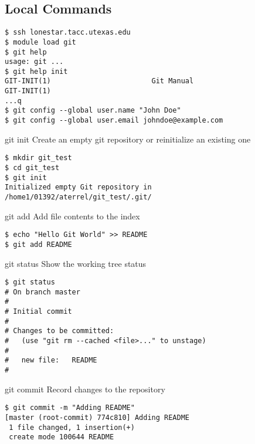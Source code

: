 \subsection{Local Commands}
\begin{frame}[fragile]
\begin{verbatim}
$ ssh lonestar.tacc.utexas.edu
$ module load git
$ git help
usage: git ...
$ git help init
GIT-INIT(1)                        Git Manual                       GIT-INIT(1)
...q
$ git config --global user.name "John Doe"
$ git config --global user.email johndoe@example.com
\end{verbatim}
\end{frame}
\begin{frame}[fragile]
\begin{block}{git init}
Create an empty git repository or reinitialize an existing one
\end{block}
\begin{verbatim}
$ mkdir git_test
$ cd git_test
$ git init
Initialized empty Git repository in
/home1/01392/aterrel/git_test/.git/
\end{verbatim}
\end{frame}

\begin{frame}[fragile]
\begin{block}{git add}
Add file contents to the index
\end{block}
\begin{verbatim}
$ echo "Hello Git World" >> README
$ git add README
\end{verbatim}
\end{frame}

\begin{frame}[fragile]
\begin{block}{git status}
Show the working tree status
\end{block}
\begin{verbatim}
$ git status
# On branch master
#
# Initial commit
#
# Changes to be committed:
#   (use "git rm --cached <file>..." to unstage)
#
#	new file:   README
#
\end{verbatim}
\end{frame}

\begin{frame}[fragile]
\begin{block}{git commit}
Record changes to the repository
\end{block}
\begin{verbatim}
$ git commit -m "Adding README"
[master (root-commit) 774c810] Adding README
 1 file changed, 1 insertion(+)
 create mode 100644 README
\end{verbatim}
\end{frame}

